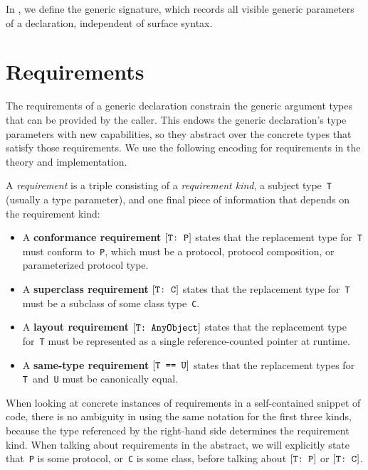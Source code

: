 \documentclass[../generics]{subfiles}
\begin{document}
In , we define the generic signature, which records all visible generic parameters of a declaration, independent of surface syntax.

\section{Requirements}\label{requirements}

The requirements of a generic declaration constrain the generic argument types that can be provided by the caller. This endows the generic declaration's type parameters with new capabilities, so they abstract over the concrete types that satisfy those requirements. We use the following encoding for requirements in the theory and implementation.

\begin{definition}\label{requirement def}
A \emph{requirement} is a triple consisting of a \emph{requirement kind}, a subject type~\texttt{T} (usually a type parameter), and one final piece of information that depends on the requirement kind:
\begin{itemize}
\item A \textbf{conformance requirement} $[\texttt{T:~P}]$ states that the replacement type for~\texttt{T} must conform to~\texttt{P}, which must be a protocol, protocol composition, or parameterized protocol type.
\item A \textbf{superclass requirement} $[\texttt{T:~C}]$ states that the replacement type for~\texttt{T} must be a subclass of some class type~\texttt{C}.
\item A \textbf{layout requirement} $[\texttt{T:~AnyObject}]$ states that the replacement type for~\texttt{T} must be represented as a single reference-counted pointer at runtime.
\item A \textbf{same-type requirement} $[\texttt{T == U}]$ states that the replacement types for \texttt{T}~and~\texttt{U} must be canonically equal.
\end{itemize}
\end{definition}

When looking at concrete instances of requirements in a self-contained snippet of code, there is no ambiguity in using the same notation for the first three kinds, because the type referenced by the right-hand side determines the requirement kind. When talking about requirements in the abstract, we will explicitly state that~\texttt{P} is some protocol, or~\texttt{C} is some class, before talking about $[\texttt{T:~P}]$ or $[\texttt{T:~C}]$.
\end{document}
